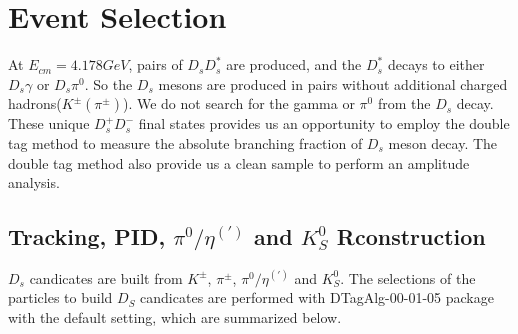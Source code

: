 \section{Event Selection}
\label{ST-selection}
At $E_{cm} = 4.178 GeV$, pairs of $D_{s}D_{s}^{*}$ are produced,  and the $D_{s}^{*}$ decays to either $D_{s}\gamma$ or $D_{s}\pi^{0}$.
So the $D_{s}$ mesons are produced in pairs without additional charged hadrons($K^{\pm}(\pi^{\pm})$).
We do not search for the gamma or $\pi^{0}$ from the $D_{s}$ decay. 
These unique $D_{s}^{+}D_{s}^{-}$ final states provides us an opportunity to employ the double tag method to measure the absolute branching fraction of $D_{s}$ meson decay.
The double tag method also provide us a clean sample to perform an amplitude analysis.


\subsection{Tracking, PID, $\pi^{0}/\eta^{(')}$ and $K_{S}^{0}$ Rconstruction }
$D_{s}$ candicates are built from $K^{\pm}$, $\pi^{\pm}$, $\pi^{0}/\eta^{(')}$ and $K_{S}^{0}$. The selections of the particles to build $D_{S}$ candicates are performed with DTagAlg-00-01-05 package with the default setting, which are summarized below.

